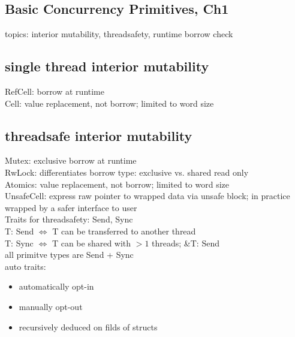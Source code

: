 \documentclass[8pt]{extarticle}
\begin{document}

  
\begin{multicols*}{2}
    
  \section{Basic Concurrency Primitives, Ch1}
  topics: interior mutability, threadsafety, runtime borrow check

  \subsection{single thread interior mutability}
  RefCell: borrow at runtime\\
  Cell: value replacement, not borrow; limited to word size
  
  \subsection{threadsafe interior mutability}
  Mutex: exclusive borrow at runtime\\
  RwLock: differentiates borrow type: exclusive vs. shared read only\\
  Atomics: value replacement, not borrow; limited to word size\\

  UnsafeCell: express raw pointer to wrapped data via unsafe block; in practice wrapped by a safer interface to user\\

  Traits for threadsafety: Send, Sync\\
  T: Send $\iff$ T can be transferred to another thread\\
  T: Sync $\iff$ T can be shared with $>1$ threads; \&T: Send\\
  all primitve types are Send + Sync\\
  
  auto traits:
  \begin{itemize}
  \item automatically opt-in
  \item manually opt-out
  \item recursively deduced on filds of structs
  \end{itemize}


\end{multicols*}
\end{document}
